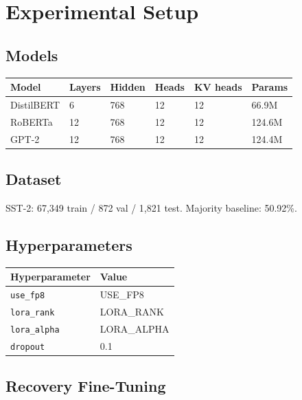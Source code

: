 \section{Experimental Setup}

\subsection{Models}

\begin{table}[H]
\centering
\small
\begin{tabular}{llllll}
\toprule
\textbf{Model} & \textbf{Layers} & \textbf{Hidden} & \textbf{Heads} & \textbf{KV heads} & \textbf{Params} \\
\midrule
DistilBERT & 6 & 768 & 12 & 12 & 66.9M \\
RoBERTa & 12 & 768 & 12 & 12 & 124.6M \\
GPT-2 & 12 & 768 & 12 & 12 & 124.4M \\
\bottomrule
\end{tabular}
\end{table}

\subsection{Dataset}

SST-2: 67,349 train / 872 val / 1,821 test. Majority baseline: 50.92\%.

\subsection{Hyperparameters}

\begin{table}[H]
\centering
\small
\begin{tabular}{ll}
\toprule
\textbf{Hyperparameter} & \textbf{Value} \\
\midrule
\texttt{use\_fp8} & {{USE\_FP8}} \\
\texttt{lora\_rank} & {{LORA\_RANK}} \\
\texttt{lora\_alpha} & {{LORA\_ALPHA}} \\
\texttt{dropout} & 0.1 \\
\bottomrule
\end{tabular}
\end{table}

\subsection{Recovery Fine-Tuning}


